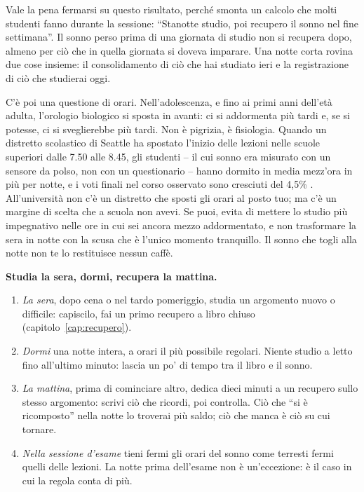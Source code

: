 Vale la pena fermarsi su questo risultato, perché smonta un calcolo
che molti studenti fanno durante la sessione: \enquote{Stanotte studio,
poi recupero il sonno nel fine settimana}. Il sonno perso prima di una
giornata di studio non si recupera dopo, almeno per ciò che in quella
giornata si doveva imparare. Una notte corta rovina due cose insieme:
il consolidamento di ciò che hai studiato ieri e la registrazione di ciò
che studierai oggi.

C'è poi una questione di orari. Nell'adolescenza, e fino ai primi anni
dell'età adulta, l'orologio biologico si sposta in avanti: ci si
addormenta più tardi e, se si potesse, ci si sveglierebbe più tardi.
Non è pigrizia, è fisiologia. Quando un distretto scolastico di Seattle
ha spostato l'inizio delle lezioni nelle scuole superiori dalle 7.50
alle 8.45, gli studenti -- il cui sonno era misurato con un sensore da
polso, non con un questionario -- hanno dormito in media mezz'ora in
più per notte, e i voti finali nel corso osservato sono cresciuti del
4,5\% \parencite{dunster2018}. All'università non c'è un distretto che
sposti gli orari al posto tuo; ma c'è un margine di scelta che a scuola
non avevi. Se puoi, evita di mettere lo studio più impegnativo nelle
ore in cui sei ancora mezzo addormentato, e non trasformare la sera in
notte con la scusa che è l'unico momento tranquillo. Il sonno che togli
alla notte non te lo restituisce nessun caffè.

\begin{inpratica}
\textbf{Studia la sera, dormi, recupera la mattina.}
\begin{enumerate}
  \item \emph{La sera}, dopo cena o nel tardo pomeriggio, studia un
        argomento nuovo o difficile: capiscilo, fai un primo recupero a
        libro chiuso (capitolo~\ref{cap:recupero}).
  \item \emph{Dormi} una notte intera, a orari il più possibile
        regolari. Niente studio a letto fino all'ultimo minuto: lascia
        un po' di tempo tra il libro e il sonno.
  \item \emph{La mattina}, prima di cominciare altro, dedica dieci
        minuti a un recupero sullo stesso argomento: scrivi ciò che
        ricordi, poi controlla. Ciò che \enquote{si è ricomposto} nella
        notte lo troverai più saldo; ciò che manca è ciò su cui tornare.
  \item \emph{Nella sessione d'esame} tieni fermi gli orari del sonno
        come terresti fermi quelli delle lezioni. La notte prima
        dell'esame non è un'eccezione: è il caso in cui la regola conta
        di più.
\end{enumerate}
\end{inpratica}

